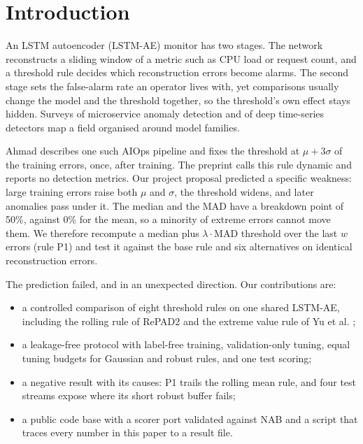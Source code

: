 \documentclass[conference]{IEEEtran}
\begin{document}
\section{Introduction}

An LSTM autoencoder (LSTM-AE) monitor has two stages. The network reconstructs a sliding window of a metric such as CPU load or request count, and a threshold rule decides which reconstruction errors become alarms. The second stage sets the false-alarm rate an operator lives with, yet comparisons usually change the model and the threshold together, so the threshold's own effect stays hidden. Surveys of microservice anomaly detection \cite{soldani2022} and of deep time-series detectors \cite{darban2024} map a field organised around model families.

Ahmad \cite{ahmad2026} describes one such AIOps pipeline and fixes the threshold at $\mu + 3\sigma$ of the training errors, once, after training. The preprint calls this rule dynamic and reports no detection metrics. Our project proposal predicted a specific weakness: large training errors raise both $\mu$ and $\sigma$, the threshold widens, and later anomalies pass under it. The median and the MAD have a breakdown point of 50\%, against 0\% for the mean, so a minority of extreme errors cannot move them. We therefore recompute a median plus $\lambda\cdot$MAD threshold over the last $w$ errors (rule P1) and test it against the base rule and six alternatives on identical reconstruction errors.

The prediction failed, and in an unexpected direction. Our contributions are:
\begin{itemize}
\item a controlled comparison of eight threshold rules on one shared LSTM-AE, including the rolling rule of RePAD2 \cite{lee2023repad2} and the extreme value rule of Yu et al. \cite{yu2024evt};
\item a leakage-free protocol with label-free training, validation-only tuning, equal tuning budgets for Gaussian and robust rules, and one test scoring;
\item a negative result with its causes: P1 trails the rolling mean rule, and four test streams expose where its short robust buffer fails;
\item a public code base with a scorer port validated against NAB and a script that traces every number in this paper to a result file.
\end{itemize}
\end{document}
